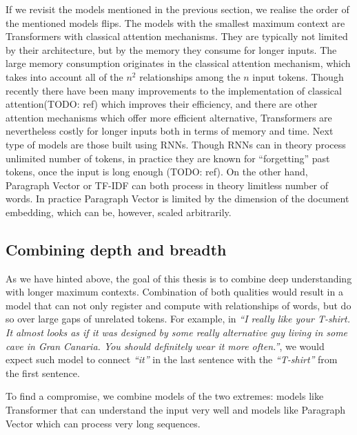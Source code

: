 If we revisit the models mentioned in the previous section, we realise the
order of the mentioned models flips. The models with the smallest maximum
context are Transformers with classical attention mechanisms. They are
typically not limited by their architecture, but by the memory they consume for
longer inputs. The large memory consumption originates in the classical
attention mechanism, which takes into account all of the $n^2$ relationships
among the $n$ input tokens. Though recently there have been many improvements
to the implementation of classical attention(TODO: ref) which improves their
efficiency, and there are other attention mechanisms which offer more efficient
alternative, Transformers are nevertheless costly for longer inputs both in
terms of memory and time. Next type of models are those built using RNNs.
Though RNNs can in theory process unlimited number of tokens, in practice they
are known for ``forgetting'' past tokens, once the input is long enough (TODO:
ref). On the other hand, Paragraph Vector or TF-IDF can both process in theory
limitless number of words. In practice Paragraph Vector is limited by the
dimension of the document embedding, which can be, however, scaled arbitrarily.

\subsection{Combining depth and breadth}

As we have hinted above, the goal of this thesis is to combine deep
understanding with longer maximum contexts. Combination of both qualities would
result in a model that can not only register and compute with relationships of
words, but do so over large gaps of unrelated tokens. For example, in \emph{``I
really like your T-shirt. It almost looks as if it was designed by some really
alternative guy living in some cave in Gran Canaria. You should definitely wear
it more often.''}, we would expect such model to connect \emph{``it''}
in the last sentence with the \emph{``T-shirt''} from the first sentence.

To find a compromise, we combine models of the two extremes: models like
Transformer that can understand the input very well and models like Paragraph
Vector which can process very long sequences.
